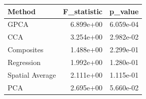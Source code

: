 \begin{tabular}{lrr}
\toprule
Method & F_statistic & p_value \\
\midrule
GPCA & 6.899e+00 & 6.059e-04 \\
CCA & 3.254e+00 & 2.982e-02 \\
Composites & 1.488e+00 & 2.299e-01 \\
Regression & 1.992e+00 & 1.280e-01 \\
Spatial Average & 2.111e+00 & 1.115e-01 \\
PCA & 2.695e+00 & 5.660e-02 \\
\bottomrule
\end{tabular}
